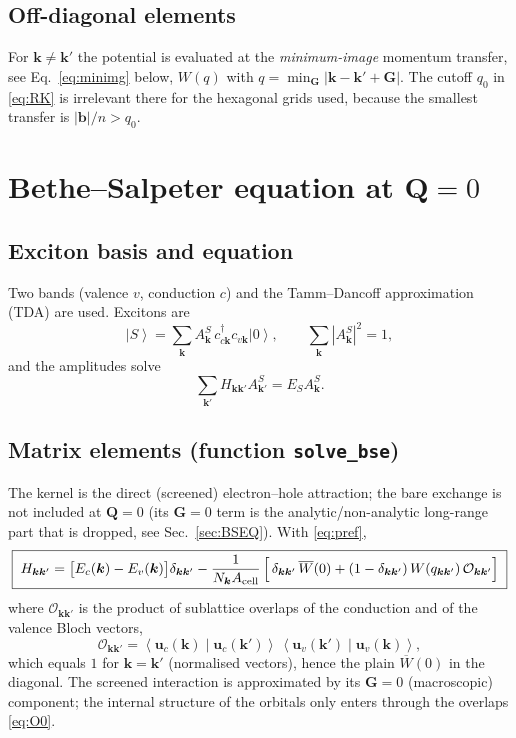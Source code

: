 \documentclass[11pt,a4paper]{article}
\newcommand{\kk}{\bm{k}}
\newcommand{\GG}{\bm{G}}
\newcommand{\bb}{\bm{b}}
\newcommand{\ket}[1]{\left|#1\right\rangle}
\newcommand{\braket}[2]{\left\langle#1\middle|#2\right\rangle}
\newcommand{\code}[1]{\texttt{#1}}
\newcommand{\Acell}{A_{\rm cell}}
\newcommand{\Nk}{N_{\bm k}}
\newcommand{\Wbar}{\overline{W}(0)}
\begin{document}
\subsection{Off-diagonal elements}
For $\kk\neq\kk'$ the potential is evaluated at the \emph{minimum-image} momentum transfer, see Eq.~\eqref{eq:minimg} below, $W(q)$ with $q=\min_{\GG}|\kk-\kk'+\GG|$. The cutoff $q_0$ in \eqref{eq:RK} is irrelevant there for the hexagonal grids used, because the smallest transfer is $|\bb|/n>q_0$.

\section{Bethe--Salpeter equation at \texorpdfstring{$\bm{Q}=0$}{Q=0}}
\label{sec:BSE0}

\subsection{Exciton basis and equation}
Two bands (valence $v$, conduction $c$) and the Tamm--Dancoff approximation (TDA) are used. Excitons are
\begin{equation}
\ket{S}=\sum_{\kk}A^S_{\kk}\,c^\dagger_{c\kk}c_{v\kk}\ket{0},\qquad \sum_{\kk}|A^S_{\kk}|^2=1,
\end{equation}
and the amplitudes solve
\begin{equation}
\sum_{\kk'}H_{\kk\kk'}A^S_{\kk'}=E_S A^S_{\kk}.
\label{eq:BSE0}
\end{equation}

\subsection{Matrix elements (function \code{solve\_bse})}
The kernel is the direct (screened) electron--hole attraction; the bare exchange is not included at $\bm Q=0$ (its $\bm G=0$ term is the analytic/non-analytic long-range part that is dropped, see Sec.~\ref{sec:BSEQ}). With \eqref{eq:pref},
\begin{equation}
\boxed{\;
H_{\kk\kk'}=\big[E_c(\kk)-E_v(\kk)\big]\delta_{\kk\kk'}
-\frac{1}{\Nk\Acell}\,\Big[\,\delta_{\kk\kk'}\,\Wbar+(1-\delta_{\kk\kk'})\,W(q_{\kk\kk'})\,\mathcal O_{\kk\kk'}\Big]\;}
\label{eq:H0}
\end{equation}
where $\mathcal O_{\kk\kk'}$ is the product of sublattice overlaps of the conduction and of the valence Bloch vectors,
\begin{equation}
\mathcal O_{\kk\kk'}=\braket{\bm u_c(\kk)}{\bm u_c(\kk')}\,\braket{\bm u_v(\kk')}{\bm u_v(\kk)},
\label{eq:O0}
\end{equation}
which equals $1$ for $\kk=\kk'$ (normalised vectors), hence the plain $\Wbar$ in the diagonal. The screened interaction is approximated by its $\bm G=0$ (macroscopic) component; the internal structure of the orbitals only enters through the overlaps \eqref{eq:O0}.
\end{document}
